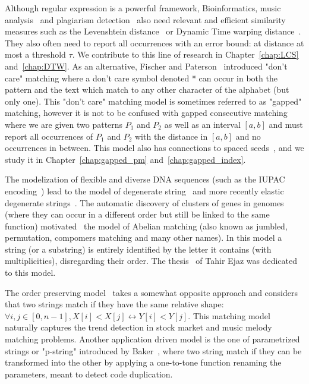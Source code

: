 Although regular expression is a powerful framework, Bioinformatics\cite{Gusfield1997}, music analysis~\cite{mongeau1990comparison} and plagiarism detection~\cite{lukashenko2007computer} also need relevant and efficient similarity measures such as the Levenshtein distance~\cite{levenshtein1966binary} or Dynamic Time warping distance~\cite{sakoe1978dynamic}. They also often need to report all occurrences with an error bound\cite{landau1986efficient,landau1989fast}: at distance at most a threshold $\tau$.
We contribute to this line of research in Chapter~\ref{chap:LCS} and~\ref{chap:DTW}.
As an alternative, Fischer and Paterson~\cite{fischer1974string} introduced "don't care" matching where a don't care symbol denoted * can occur in both the pattern and the text which match to any other character of the alphabet (but only one).
This "don't care" matching model is sometimes referred to as "gapped" matching, however it is not to be confused with gapped consecutive matching~\cite{bille2022gapped} where we are given two patterns $P_1$ and $P_2$ as well as an interval $[a,b]$ and must report all occurrences of $P_1$ and $P_2$ with the distance in $[a,b]$ and no occurrences in between. This model also has connections to spaced seeds~\cite{burkhardt2003better}, and we study it in Chapter~\ref{chap:gapped_pm} and~\ref{chap:gapped_index}.

The modelization of flexible and diverse DNA sequences (such as the IUPAC encoding~\cite{comm1970iupac}) lead to the model of degenerate string~\cite{abrahamson1987generalized} and more recently elastic degenerate strings~\cite{iliopoulos2021efficient}.
The automatic discovery of clusters of genes in genomes (where they can occur in a different order but still be linked to the same function) motivated~\cite{eres2004permutation} the model of Abelian matching (also known as jumbled, permutation, compomers matching and many other names). In this model a string (or a substring) is entirely identified by the letter it contains (with multiplicities), disregarding their order. The thesis~\cite{ejaz2010abelian} of Tahir Ejaz was dedicated to this model.


The order preserving model~\cite{kim2014order,kubica2013linear} takes a somewhat opposite approach and considers that two strings match if they have the same relative shape: $\forall i,j \in [0,n-1], X[i] < X[j] \leftrightarrow Y[i] < Y[j]$. This matching model naturally captures the trend detection in stock market and music melody matching problems.
%
Another application driven model is the one of parametrized strings or "p-string" introduced by Baker~\cite{baker1993theory}, where two string match if they can be transformed into the other by applying a one-to-tone function renaming the parameters, meant to detect code duplication.

